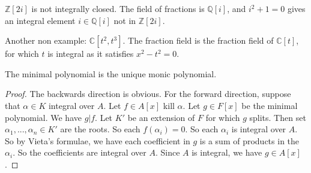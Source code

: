 \begin{remark}
    $\mathbb{Z}[2i]$ is not integrally closed. The field of fractions is $\mathbb{Q}[i]$, and $i^2+1=0$ gives an integral element $i\in \mathbb{Q}[i]$ not in $\mathbb{Z}[2i]$.

    Another non example: $\mathbb{C}[t^2,t^3]$. The fraction field is the fraction field of $\mathbb{C}[t]$, for which $t$ is integral as it satisfies $x^2-t^2=0$. 
\end{remark}
\begin{remark}
    The minimal polynomial is the unique monic polynomial.
\end{remark}
\begin{proof}
    The backwards direction is obvious.
    For the forward direction, suppose that $\alpha\in K$ integral over $A$. Let $f\in A[x]$ kill $\alpha$. Let $g\in F[x]$ be the minimal polynomial. We have $g|f$. Let $K'$ be an extension of $F$ for which $g$ splits. Then set $\alpha_1,...,\alpha_n \in K'$  are the roots. So each $f(\alpha_i)=0$. So each $\alpha_i$ is integral over $A$. So by Vieta's formulae, we have each coefficient in $g$ is a sum of products in the $\alpha_i$. So the coefficients are integral over $A$. Since $A$ is integral, we have $g\in A[x]$.
\end{proof}